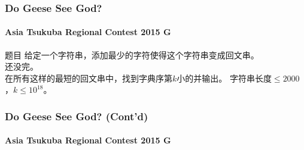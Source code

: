 \documentclass[hyperref={unicode=true}]{beamer}
\begin{document}
  \begin{frame}\frametitle{Do Geese See God?}
    \framesubtitle{Asia Tsukuba Regional Contest 2015 G}
    \begin{block}{题目}
      给定一个字符串，添加最少的字符使得这个字符串变成回文串。\\
      \pause{}还没完。\\
      在所有这样的最短的回文串中，找到字典序第$k$小的并输出。
      字符串长度$\leq 2000$，$k \leq 10^{18}$。
    \end{block}
  \end{frame}
  \begin{frame}\frametitle{Do Geese See God? (Cont'd)}
    \framesubtitle{Asia Tsukuba Regional Contest 2015 G}

  \end{frame}
\end{document}
